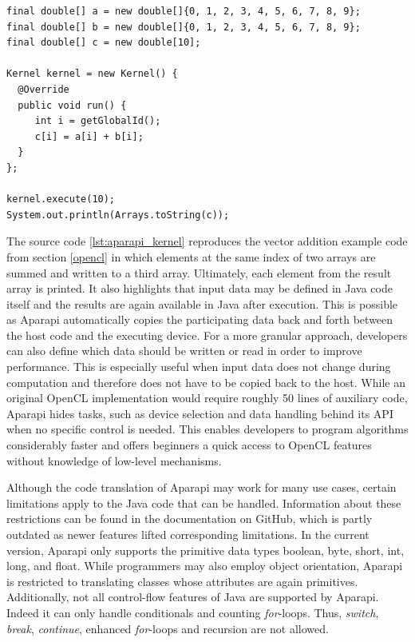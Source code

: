 \begin{minipage}{\linewidth}
\begin{lstlisting}[caption=Aparapi Vector Addition Kernel,captionpos=b,label=lst:aparapi_kernel]
final double[] a = new double[]{0, 1, 2, 3, 4, 5, 6, 7, 8, 9};
final double[] b = new double[]{0, 1, 2, 3, 4, 5, 6, 7, 8, 9};
final double[] c = new double[10];

Kernel kernel = new Kernel() {
  @Override
  public void run() {
     int i = getGlobalId();
     c[i] = a[i] + b[i];
  }
};

kernel.execute(10);
System.out.println(Arrays.toString(c));
\end{lstlisting}
\end{minipage}
The source code \ref{lst:aparapi_kernel} reproduces the vector addition example code from section \ref{opencl} in which elements at the same index of two arrays are summed and written to a third array. Ultimately, each element from the result array is printed. It also highlights that input data may be defined in Java code itself and the results are again available in Java after execution. This is possible as Aparapi automatically copies the participating data back and forth between the host code and the executing device. For a more granular approach, developers can also define which data should be written or read in order to improve performance. This is especially useful when input data does not change during computation and therefore does not have to be copied back to the host. While an original OpenCL implementation would require roughly 50 lines of auxiliary code, Aparapi hides tasks, such as device selection and data handling behind its API when no specific control is needed. This enables developers to program algorithms considerably faster and offers beginners a quick access to OpenCL features without knowledge of low-level mechanisms.

Although the code translation of Aparapi may work for many use cases, certain limitations apply to the Java code that can be handled. Information about these restrictions can be found in the documentation on GitHub\cite{aparapi_kernel_guidelines}, which is partly outdated as newer features lifted corresponding limitations. In the current version, Aparapi only supports the primitive data types boolean, byte, short, int, long, and float. While programmers may also employ object orientation, Aparapi is restricted to translating classes whose attributes are again primitives. Additionally, not all control-flow features of Java are supported by Aparapi. Indeed it can only handle conditionals and counting \textit{for}-loops. Thus, \textit{switch}, \textit{break}, \textit{continue}, enhanced \textit{for}-loops and recursion are not allowed.
